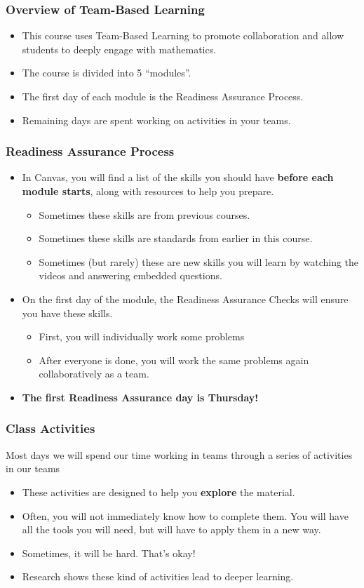 \documentclass[aspectratio=1610]{beamer}
\begin{document}
  \begin{frame}\frametitle{Overview of Team-Based Learning}
  \begin{itemize}
  \item This course uses Team-Based Learning to promote collaboration and allow students to deeply engage with mathematics.
  \item The course is divided into 5 ``modules''.
  \item The first day of each module is the Readiness Assurance Process.
  \item Remaining days are spent working on activities in your teams.
  \end{itemize}
  \end{frame}

  \begin{frame}\frametitle{Readiness Assurance Process}
  \begin{itemize}
  \item In Canvas, you will find a list of the skills you should have {\bf before each module starts}, along with resources to help you prepare.
  \begin{itemize}
  \item Sometimes these skills are from previous courses.
  \item Sometimes these skills are standards from earlier in this course.
    \item Sometimes (but rarely) these are new skills you will learn by watching the videos and answering embedded questions.
  \end{itemize}
  \pause \item On the first day of the module, the Readiness Assurance Checks will ensure you have these skills.
  \begin{itemize}
  \item First, you will individually work some problems
  \item After everyone is done, you will work the same problems again collaboratively as a team.
  \end{itemize}
  \item {\bf The first Readiness Assurance day is Thursday!}
  \end{itemize}
  \end{frame}
  
  
\begin{frame}\frametitle{Class Activities}
Most days we will spend our time working in teams through a series of activities in our teams
\begin{itemize}
\item These activities are designed to help you \textbf{explore} the material.
\item Often, you will not immediately know how to complete them.  You will have all the tools you will need, but will have to apply them in a new way.
\item Sometimes, it will be hard.  That's okay!
\item Research shows these kind of activities lead to deeper learning.
\end{itemize}

\end{frame}
\end{document}
